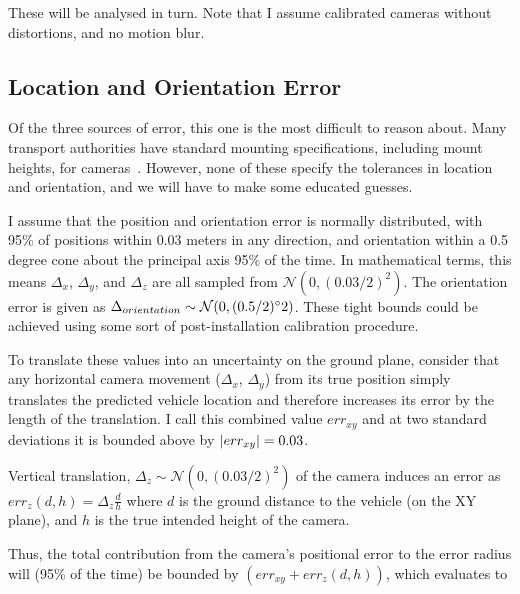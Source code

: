 \documentclass[a4paper,12pt,twoside,openright]{report}
\begin{document}
These will be analysed in turn. Note that I assume calibrated cameras without distortions, and no motion blur.

\subsection{Location and Orientation Error}

Of the three sources of error, this one is the most difficult to reason about. 
Many transport authorities have standard mounting specifications, including mount heights, for cameras~\cite{StreetscapeGuideance}.
However, none of these specify the tolerances in location and orientation, and we will have to make some educated guesses.

I assume that the position and orientation error is normally distributed, with
95\% of positions within 0.03 meters in any direction, 
and orientation within a 0.5 degree cone about the principal axis 95\% of the time.
In mathematical terms, this means $\Delta_{x}$, $\Delta_{y}$, and $\Delta_{z}$ 
are all sampled from $\mathcal{N}(0, (0.03/2)^2)$. The orientation error is given as
$\Delta_{orientation} \sim \mathcal{N}(0, (0.5/2)\degree2)$.
These tight bounds could be achieved using some sort of post-installation 
calibration procedure. 


To translate these values into an uncertainty on the ground plane, consider that
any horizontal camera movement ($\Delta_{x}$, $\Delta_{y}$) from its true position simply translates
the predicted vehicle location and therefore increases its error by the length of the translation.
I call this combined value $err_{xy}$ and at two standard deviations it is bounded above by
$\abs{err_{xy}} = 0.03$.

Vertical translation, $\Delta_z\sim \mathcal{N}(0, (0.03/2)^2)$
of the camera induces an error as $err_{z}(d, h) = \Delta_z \frac{d}{h}$ %
where $d$ is the ground distance to the vehicle (on the XY plane), and $h$ is the true intended
height of the camera.

Thus, the total contribution from the camera's positional error to the error radius
will (95\% of the time) be bounded by $(err_{xy} + err_{z}(d, h))$, which evaluates to
\end{document}
